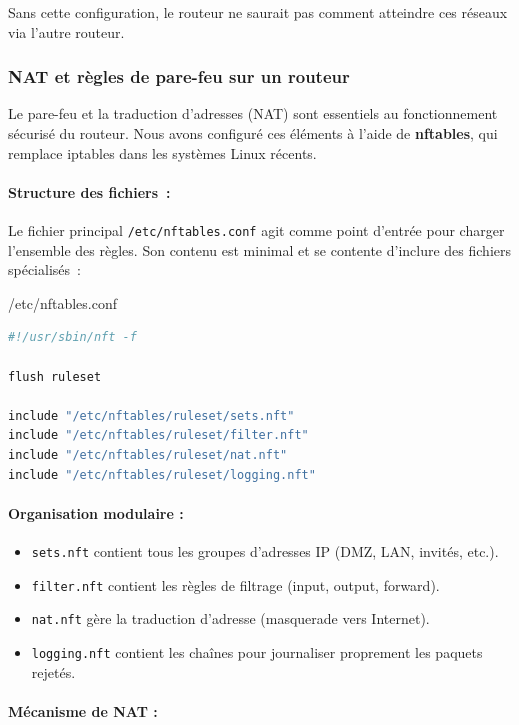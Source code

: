\documentclass{article}
\begin{document}
Sans cette configuration, le routeur ne saurait pas comment atteindre ces réseaux via l'autre routeur.

\subsubsection{NAT et règles de pare-feu sur un routeur}

Le pare-feu et la traduction d’adresses (NAT) sont essentiels au fonctionnement sécurisé du routeur. Nous avons configuré ces éléments à l’aide de \textbf{nftables}, qui remplace iptables dans les systèmes Linux récents.

\paragraph{Structure des fichiers~:}

Le fichier principal \texttt{/etc/nftables.conf} agit comme point d’entrée pour charger l’ensemble des règles. Son contenu est minimal et se contente d’inclure des fichiers spécialisés~:

\begin{configbox}{/etc/nftables.conf}
\begin{lstlisting}[language=bash]
#!/usr/sbin/nft -f

flush ruleset

include "/etc/nftables/ruleset/sets.nft"
include "/etc/nftables/ruleset/filter.nft"
include "/etc/nftables/ruleset/nat.nft"
include "/etc/nftables/ruleset/logging.nft"
\end{lstlisting}
\end{configbox}

\paragraph{Organisation modulaire :}
\begin{itemize}
  \item \texttt{sets.nft} contient tous les groupes d'adresses IP (DMZ, LAN, invités, etc.).
  \item \texttt{filter.nft} contient les règles de filtrage (input, output, forward).
  \item \texttt{nat.nft} gère la traduction d'adresse (masquerade vers Internet).
  \item \texttt{logging.nft} contient les chaînes pour journaliser proprement les paquets rejetés.
\end{itemize}

\paragraph{Mécanisme de NAT :}
\end{document}
